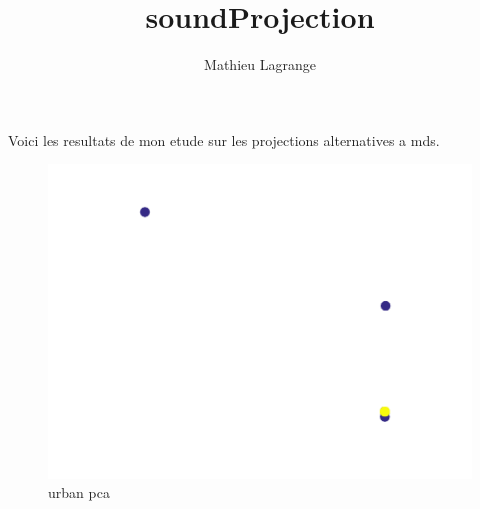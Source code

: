 \documentclass[12pt,a4paper,fleqn]{tufte-handout}
\title{soundProjection}
\author{ Mathieu Lagrange }
\begin{document}
    
 
\maketitle    
 
Voici les resultats de mon etude sur les projections alternatives a mds.   
 
 
 
\begin{figure}   
\begin{center}   
\includegraphics[scale=.5]{figures/urban_pca}   
\caption{urban pca}   
\end{center}   
\end{figure}   
 
\end{document}

